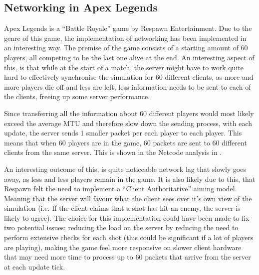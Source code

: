 \subsection{Networking in Apex Legends}
Apex Legends is a ``Battle Royale'' game by Respawn Entertainment. Due to the genre of this game, the implementation of networking has been implemented in an interesting way. The premise of the game consists of a starting amount of 60 players, all competing to be the last one alive at the end. An interesting aspect of this, is that while at the start of a match, the server might have to work quite hard to effectively synchronise the simulation for 60 different clients, as more and more players die off and less are left, less information needs to be sent to each of the clients, freeing up some server performance.

Since transferring all the information about 60 different players would most likely exceed the average MTU and therefore slow down the sending process, with each update, the server sends 1 smaller packet per each player to each player. This means that when 60 players are in the game, 60 packets are sent to 60 different clients from the same server. This is shown in the Netcode analysis in .

An interesting outcome of this, is quite noticeable network lag that slowly goes away, as less and less players remain in the game. It is also likely due to this, that Respawn felt the need to implement a ``Client Authoritative'' aiming model. Meaning that the server will favour what the client sees over it's own view of the simulation (i.e. If the client claims that a shot has hit an enemy, the server is likely to agree). The choice for this implementation could have been made to fix two potential issues; reducing the load on the server by reducing the need to perform extensive checks for each shot (this could be significant if a lot of players are playing), making the game feel more responsive on slower client hardware that may need more time to process up to 60 packets that arrive from the server at each update tick.

